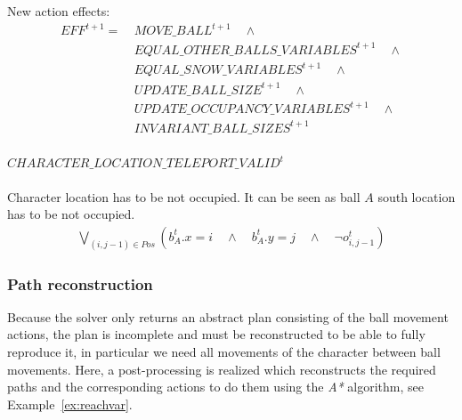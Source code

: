 \documentclass{report}
\theoremstyle{plain}
\begin{document}
New action effects:
\begin{align*}
EFF^{t+1} = \ & MOVE\_BALL^{t+1} \quad \wedge \\
& EQUAL\_OTHER\_BALLS\_VARIABLES^{t+1} \quad \wedge \\
& EQUAL\_SNOW\_VARIABLES^{t+1}  \quad \wedge \\
& UPDATE\_BALL\_SIZE^{t+1} \quad \wedge \\
& UPDATE\_OCCUPANCY\_VARIABLES^{t+1} \quad \wedge \\
& INVARIANT\_BALL\_SIZES^{t+1}
\end{align*}

\paragraph{$CHARACTER\_LOCATION\_TELEPORT\_VALID^t$}
Character location has to be not occupied. It can be seen as ball $A$ south location has to be not occupied.
\begin{align*}
\bigvee \limits_{(i, j-1) \in Pos} (b_A^t.x = i \quad \wedge \quad b_A^t.y = j \quad \wedge \quad \lnot o_{i,j-1}^t)
\end{align*}

\subsubsection{Path reconstruction}
Because the solver only returns an abstract plan consisting of the ball movement actions, the plan is incomplete and must be reconstructed to be able to fully reproduce it, in particular we need all movements of the character between ball movements. Here, a post-processing  is realized which reconstructs the required paths and the corresponding actions to do them using the \emph{A*} algorithm, see Example~\ref{ex:reachvar}.

\vspace{1\baselineskip}
\end{document}
